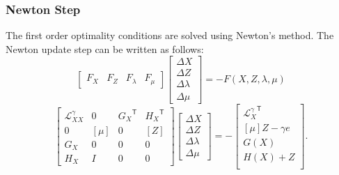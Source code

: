 \documentclass[12pt]{article}
\newcommand{\trans}[1]{{#1}^{\ensuremath{\mathsf{T}}}}  %
\newcommand{\diag}[1]{\left[{#1}\right]}                %
\numberwithin{equation}{section}
\numberwithin{table}{section}
\numberwithin{figure}{section}
\begin{document}
\begin{appendices}
\subsubsection{Newton Step}

The first order optimality conditions are solved using Newton's method. The Newton update step can be written as follows:
\begin{equation}
\left[\begin{array}{cccc}
F_X & F_Z & F_\lambda & F_\mu
\end{array}\right]
\left[\begin{array}{c}
\Delta X \\
\Delta Z \\
\Delta \lambda \\
\Delta \mu
\end{array}\right]
= -F(X, Z, \lambda, \mu)
\end{equation}
\begin{equation}
\left[\begin{array}{cccc}
\mathcal{L}^\gamma_{XX} & 0 & \trans{G_X} & \trans{H_X} \\
0 & \diag{\mu} & 0 & \diag{Z} \\
G_X & 0 & 0 & 0 \\
H_X & I & 0 & 0
\end{array}\right]
\left[\begin{array}{c}
\Delta X \\
\Delta Z \\
\Delta \lambda \\
\Delta \mu
\end{array}\right]
= -\left[\begin{array}{c}
\trans{\mathcal{L}^\gamma_X} \\
\diag{\mu} Z - \gamma e \\
G(X) \\
H(X) + Z \\
\end{array}\right].
\label{eq:newton_step}
\end{equation}


\end{appendices}
\end{document}

